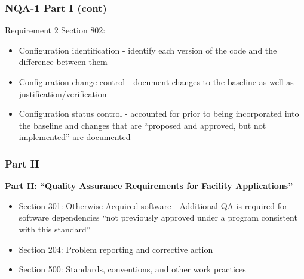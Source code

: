 \documentclass[12pt]{beamer}
\begin{document}
\begin{frame}
\frametitle{NQA-1 Part I (cont)}

Requirement 2 Section 802:
\begin{itemize}
\item{\alert{Configuration identification} - identify each version of the code and the difference between them}
\item{\alert{Configuration change control} - document changes to the baseline as well as justification/verification}
\item{\alert{Configuration status control} - accounted for prior to being incorporated into the baseline and changes that are “proposed and approved, but not implemented” are documented \cite{add}}
\end{itemize}
\end{frame}
\begin{frame}
\frametitle{Part II}

{\bf Part II: ``Quality Assurance Requirements for Facility Applications''}

\begin{itemize}
\item{Section 301: \alert{Otherwise Acquired software} - Additional QA is required for software dependencies ``not previously approved under a program consistent with this standard''}
\item{Section 204: \alert{Problem reporting} and \alert{corrective action}}
\item{Section 500: \alert{Standards}, \alert{conventions}, and other \alert{work practices}}
\end{itemize}

\end{frame}
\end{document}
